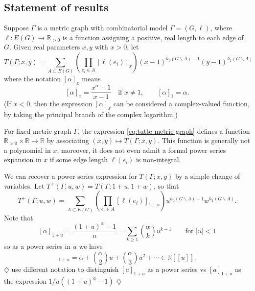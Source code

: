 \documentclass{amsart}
\theoremstyle{definition}
\newcommand{\RR}{\mathbb{R}}
\newcommand{\harry}[1]{{\color{red} \sf $\diamondsuit$  {#1} $\diamondsuit$ }}
\newcommand{\note}[1]{\harry{#1}}
\begin{document}
\subsection{Statement of results}
Suppose $\Gamma$ is a metric graph with combinatorial model $\Gamma = (G,\ell)$,
where $\ell : E(G) \to \RR_{>0}$ is a function assigning a positive, real 
 length to each edge of $G$.
Given real parameters $x,y$ with $x > 0$,
let 
\begin{equation}
\label{eq:tutte-metric-graph}
T(\Gamma; x,y) = \sum_{A \subset E(G)} \left( \prod_{e_i \in A} [\ell(e_i)]_{x} \right)
(x-1)^{h_0(G\backslash A) - 1}(y-1)^{h_1(G\backslash A)}
\end{equation}
where the notation $[\alpha]_x$ means
\begin{equation*}
\label{eq:q-analog-real}
[\alpha]_x = \frac{x^\alpha - 1}{x-1}
\quad\text{if } x \neq 1,
\qquad 
[\alpha]_1 = \alpha.
\end{equation*}
(If $x < 0$, then the expression $[\alpha]_x$ can be considered a complex-valued function,
by taking the principal branch of the complex logarithm.)


For fixed metric graph $\Gamma$,
the expression \eqref{eq:tutte-metric-graph} defines a function
$\RR_{>0}\times \RR \to \RR$
by associating $(x,y) \mapsto T(\Gamma; x,y)$. 
This function is generally not a polynomial in $x$; %
moreover,  it does not even admit a formal power series expansion in $x$ 
if some edge length $\ell(e_i)$ is non-integral.

We can recover a power series expression for $T(\Gamma; x,y)$ by a simple change of variables.
Let
$T^+(\Gamma; u,w) = T(\Gamma; 1 + u, 1 + w) $,
so that
\begin{equation}
\label{eq:tutte-power-series}
T^+(\Gamma; u,w) = \sum_{A \subset E(G)} \left( \prod_{e_i \in A} [\ell(e_i)]_{1+u} \right)
u^{h_0(G\backslash A) - 1}w^{h_1(G\backslash A)} .
\end{equation}
Note that
\[ [\alpha]_{1+u} = \frac{(1+u)^\alpha - 1}{u}
= \sum_{k \geq 1} \binom{\alpha}{k}u^{k-1} 
\qquad \text{for } |u|<1
\]
so as a power series in $u$ we have 
\begin{equation}
[\alpha]_{1+u} = \alpha + \binom{\alpha}{2} u + \binom{\alpha}{3} u^2 + \cdots
\in \RR[[u]] .
\end{equation}
\note{use different notation to distinguish $[a]_{1+u}$ as a power series vs $[a]_{1+u}$ as the expression $1/u((1+u)^a-1)$}
\end{document}
